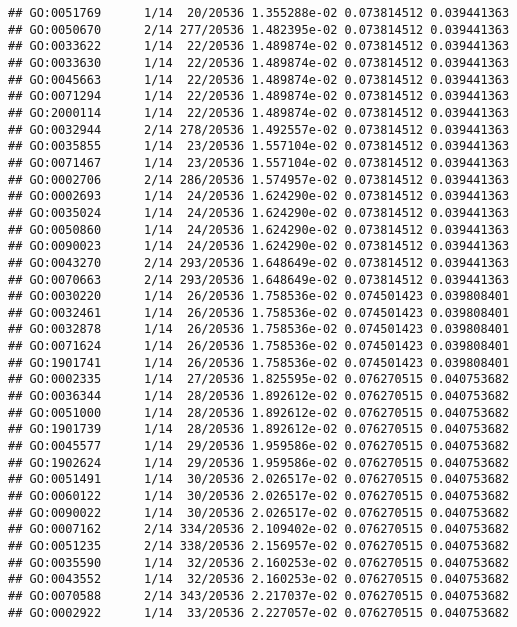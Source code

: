 \documentclass[
]{article}
\begin{document}
\begin{verbatim}
## GO:0051769      1/14  20/20536 1.355288e-02 0.073814512 0.039441363
## GO:0050670      2/14 277/20536 1.482395e-02 0.073814512 0.039441363
## GO:0033622      1/14  22/20536 1.489874e-02 0.073814512 0.039441363
## GO:0033630      1/14  22/20536 1.489874e-02 0.073814512 0.039441363
## GO:0045663      1/14  22/20536 1.489874e-02 0.073814512 0.039441363
## GO:0071294      1/14  22/20536 1.489874e-02 0.073814512 0.039441363
## GO:2000114      1/14  22/20536 1.489874e-02 0.073814512 0.039441363
## GO:0032944      2/14 278/20536 1.492557e-02 0.073814512 0.039441363
## GO:0035855      1/14  23/20536 1.557104e-02 0.073814512 0.039441363
## GO:0071467      1/14  23/20536 1.557104e-02 0.073814512 0.039441363
## GO:0002706      2/14 286/20536 1.574957e-02 0.073814512 0.039441363
## GO:0002693      1/14  24/20536 1.624290e-02 0.073814512 0.039441363
## GO:0035024      1/14  24/20536 1.624290e-02 0.073814512 0.039441363
## GO:0050860      1/14  24/20536 1.624290e-02 0.073814512 0.039441363
## GO:0090023      1/14  24/20536 1.624290e-02 0.073814512 0.039441363
## GO:0043270      2/14 293/20536 1.648649e-02 0.073814512 0.039441363
## GO:0070663      2/14 293/20536 1.648649e-02 0.073814512 0.039441363
## GO:0030220      1/14  26/20536 1.758536e-02 0.074501423 0.039808401
## GO:0032461      1/14  26/20536 1.758536e-02 0.074501423 0.039808401
## GO:0032878      1/14  26/20536 1.758536e-02 0.074501423 0.039808401
## GO:0071624      1/14  26/20536 1.758536e-02 0.074501423 0.039808401
## GO:1901741      1/14  26/20536 1.758536e-02 0.074501423 0.039808401
## GO:0002335      1/14  27/20536 1.825595e-02 0.076270515 0.040753682
## GO:0036344      1/14  28/20536 1.892612e-02 0.076270515 0.040753682
## GO:0051000      1/14  28/20536 1.892612e-02 0.076270515 0.040753682
## GO:1901739      1/14  28/20536 1.892612e-02 0.076270515 0.040753682
## GO:0045577      1/14  29/20536 1.959586e-02 0.076270515 0.040753682
## GO:1902624      1/14  29/20536 1.959586e-02 0.076270515 0.040753682
## GO:0051491      1/14  30/20536 2.026517e-02 0.076270515 0.040753682
## GO:0060122      1/14  30/20536 2.026517e-02 0.076270515 0.040753682
## GO:0090022      1/14  30/20536 2.026517e-02 0.076270515 0.040753682
## GO:0007162      2/14 334/20536 2.109402e-02 0.076270515 0.040753682
## GO:0051235      2/14 338/20536 2.156957e-02 0.076270515 0.040753682
## GO:0035590      1/14  32/20536 2.160253e-02 0.076270515 0.040753682
## GO:0043552      1/14  32/20536 2.160253e-02 0.076270515 0.040753682
## GO:0070588      2/14 343/20536 2.217037e-02 0.076270515 0.040753682
## GO:0002922      1/14  33/20536 2.227057e-02 0.076270515 0.040753682

\end{verbatim}
\end{document}
